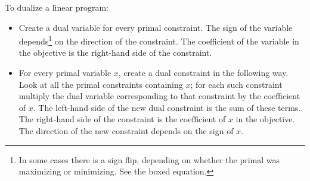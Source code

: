 \documentclass{article}
\begin{document}
To dualize a linear program:
\begin{itemize}
\item Create a dual variable for every primal constraint.
  The sign of the variable depends\footnote{In some cases there is a sign flip, depending on whether the primal was maximizing or minimizing.  See the boxed equation.} on the direction of the constraint.
  The coefficient of the variable in the objective is the right-hand side of the constraint.
\item For every primal variable \(x\), create a dual constraint in the following way.
  Look at all the primal constraints containing \(x\); for each such constraint multiply the dual variable corresponding to that constraint by the coefficient of \(x\).
  The left-hand side of the new dual constraint is the sum of these terms.
  The right-hand side of the constraint is the coefficient of \(x\) in the objective.
  The direction of the new constraint depends\footnotemark[\value{footnote}]{} on the sign of \(x\).
\end{itemize}
\end{document}
